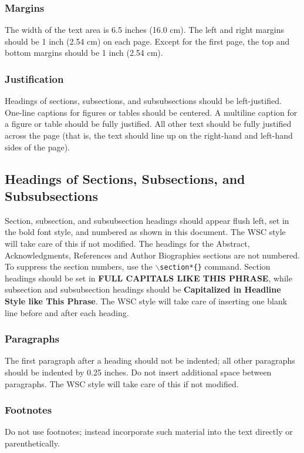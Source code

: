 \documentclass{wscpaperproc}
\theoremstyle{wsc}
\begin{document}
\subsubsection{Margins}
The width of the text area is 6.5 inches (16.0 cm). The left and right margins should be 1 inch (2.54 cm) on each page. Except for the first page, the top and bottom margins should be 1 inch (2.54 cm).

\subsubsection{Justification}
Headings of sections, subsections, and subsubsections should be left-justified. One-line captions for figures or tables should be centered.
A multiline caption for a figure or table should be fully justified. All other text should be fully justified across the page (that is, the text should line up on the right-hand and left-hand sides of the page).

\subsection{Headings of Sections, Subsections, and Subsubsections}
Section, subsection, and subsubsection headings should appear flush left, set in the bold font style, and numbered as shown in this document. The WSC style will take care of this if not modified.
The headings for the Abstract, Acknowledgments, References and Author Biographies sections are not numbered.
To suppress the section numbers, use the {\tt $\backslash$section*\{\}} command.
Section headings should be set in {\bf FULL CAPITALS LIKE THIS PHRASE}, while subsection and subsubsection headings should be {\bf Capitalized
in Headline Style like This Phrase}. The WSC style will take care of inserting one blank line before and after each heading.

\subsubsection{Paragraphs}
The first paragraph after a heading should not be indented; all other paragraphs should be indented by 0.25 inches. Do not insert additional space between paragraphs. The WSC style will take care of this if not modified.

\subsubsection{Footnotes}
Do not use footnotes; instead incorporate such material into the text directly or parenthetically.
\end{document}
